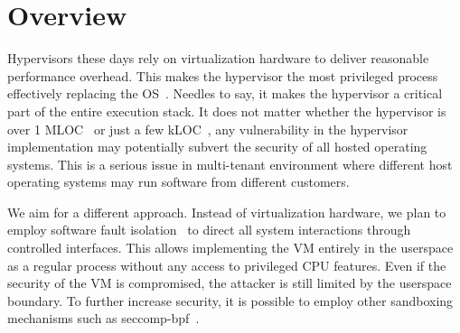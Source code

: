 \section{Overview}
\label{sec:overview}


Hypervisors these days rely on virtualization hardware to deliver
reasonable performance overhead. This makes the hypervisor the most
privileged process effectively replacing the OS~\cite{heiser:hotos11}.
Needles to say, it makes the hypervisor a critical part of the entire
execution stack.  It does not matter whether the hypervisor is over 1
MLOC~\cite{barham:sosp03} or just a few kLOC~\cite{steinberg:eurosys10},
any vulnerability in the hypervisor implementation may potentially
subvert the security of all hosted operating systems. This is a serious
issue in multi-tenant environment where different host operating systems
may run software from different customers.

We aim for a different approach. Instead of virtualization hardware, we
plan to employ software fault isolation~\cite{wahbe:sosp93} to direct
all system interactions through controlled interfaces. This allows
implementing the VM entirely in the userspace as a regular process
without any access to privileged CPU features. Even if the security of
the VM is compromised, the attacker is still limited by the userspace
boundary. To further increase security, it is possible to employ other
sandboxing mechanisms such as seccomp-bpf~\cite{seccomp-bpf:linux}.

